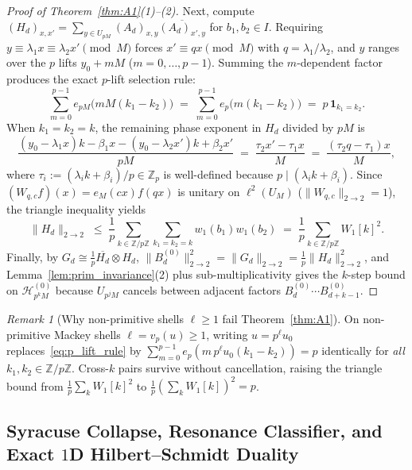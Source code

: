 \documentclass[11pt,a4paper]{article}
\numberwithin{equation}{section}
\theoremstyle{definition}
\theoremstyle{remark}
\newtheorem{remark}[theorem]{Remark}
\newcommand{\Z}{\mathbb{Z}}
\newcommand{\cH}{\mathcal{H}}
\begin{document}
\begin{proof}[Proof of Theorem~\ref{thm:A1}(1)--(2)]
Next, compute $(H_d)_{x, x'} = \sum_{y \in U_{pM}} (A_d)_{x, y}\overline{(A_d)_{x', y}}$ for $b_1, b_2 \in I$. Requiring $y \equiv \lambda_1 x \equiv \lambda_2 x' \pmod M$ forces $x' \equiv q x \pmod M$ with $q = \lambda_1/\lambda_2$, and $y$ ranges over the $p$ lifts $y_0 + mM$ ($m = 0, \dots, p-1$). Summing the $m$-dependent factor produces the exact $p$-lift selection rule:
\begin{equation}\label{eq:p_lift_rule}
\sum_{m=0}^{p-1} e_{pM}\bigl(mM(k_1 - k_2)\bigr) \;=\; \sum_{m=0}^{p-1} e_p\bigl(m(k_1 - k_2)\bigr) \;=\; p\,\mathbf{1}_{k_1 = k_2}.
\end{equation}
When $k_1 = k_2 = k$, the remaining phase exponent in $H_d$ divided by $pM$ is
\[
\frac{(y_0 - \lambda_1 x)k - \beta_1 x - (y_0 - \lambda_2 x')k + \beta_2 x'}{pM} \;=\; \frac{\tau_2 x' - \tau_1 x}{M} \;=\; \frac{(\tau_2 q - \tau_1)x}{M},
\]
where $\tau_i := (\lambda_i k + \beta_i)/p \in \Z_p$ is well-defined because $p \mid (\lambda_i k + \beta_i)$. Since $(W_{q, c} f)(x) = e_M(cx)f(qx)$ is unitary on $\ell^2(U_M)$ ($\|W_{q,c}\|_{2\to 2} = 1$), the triangle inequality yields
\[
\|H_d\|_{2\to 2} \;\le\; \frac{1}{p}\sum_{k \in \Z/p\Z} \sum_{k_1 = k_2 = k} w_1(b_1)w_1(b_2) \;=\; \frac{1}{p}\sum_{k \in \Z/p\Z} W_1[k]^2.
\]
Finally, by $G_d \cong \frac{1}{p}\overline{H_d}\otimes H_d$, $\|B_d^{(0)}\|_{2\to 2}^2 = \|G_d\|_{2\to 2} = \frac{1}{p}\|H_d\|_{2\to 2}^2$, and Lemma~\ref{lem:prim_invariance}(2) plus sub-multiplicativity gives the $k$-step bound on $\cH_{p^k M}^{(0)}$ because $U_{p^j M}$ cancels between adjacent factors $B_d^{(0)} \cdots B_{d+k-1}^{(0)}$.
\end{proof}

\begin{remark}[Why non-primitive shells $\ell \ge 1$ fail Theorem~\ref{thm:A1}]
On non-primitive Mackey shells $\ell = v_p(u) \ge 1$, writing $u = p^\ell u_0$ replaces~\eqref{eq:p_lift_rule} by $\sum_{m=0}^{p-1} e_p(m\,p^\ell u_0(k_1 - k_2)) = p$ identically for \emph{all} $k_1, k_2 \in \Z/p\Z$. Cross-$k$ pairs survive without cancellation, raising the triangle bound from $\frac{1}{p}\sum_k W_1[k]^2$ to $\frac{1}{p}(\sum_k W_1[k])^2 = p$.
\end{remark}

\subsection{Syracuse Collapse, Resonance Classifier, and Exact $1$D Hilbert--Schmidt Duality}\label{subsec:syracuse_collapse}
\end{document}
